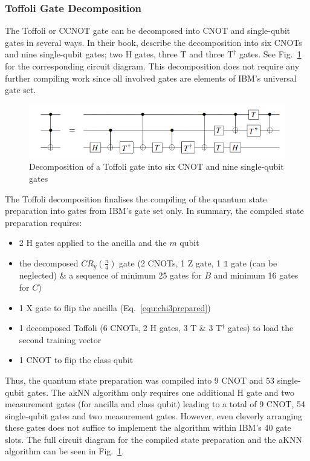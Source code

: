 \subsubsection{Toffoli Gate Decomposition}
\label{subsubsubsec:toffoli}

The Toffoli or CCNOT gate can be decomposed into CNOT and single-qubit gates in several ways. In their book,  describe the decomposition into six CNOTs and nine single-qubit gates; two H gates, three T and three T$^\dagger$ gates. See Fig.~\ref{img:toffolidecomp} for the corresponding circuit diagram. This decomposition does not require any further compiling work since all involved gates are elements of IBM's universal gate set.

\begin{figure}[!ht]
       \centering
       \includegraphics[scale=0.5]{img/toffolidecomposition.png}
       \caption[]{\label{img:toffolidecomp} Decomposition of a Toffoli gate into six CNOT and nine single-qubit gates\footnotemark[17]}
\end{figure}


The Toffoli decomposition finalises the compiling of the quantum state preparation into gates from IBM's gate set only. In summary, the compiled state preparation requires: 
\begin{itemize}
\item 2 H gates applied to the ancilla and the $m$ qubit
\item the decomposed $CR_y(\frac{\pi}{4})$ gate (2 CNOTs, 1 Z gate, 1 $\mathbb{1}$ gate (can be neglected) \& a sequence of minimum 25 gates for $B$ and minimum 16 gates for $C$)
\item 1 X gate to flip the ancilla (Eq.~\ref{equ:chi3prepared})
\item 1 decomposed Toffoli (6 CNOTs, 2 H gates, 3 T \& 3 T$^\dagger$ gates) to load the second training vector
\item 1 CNOT to flip the class qubit
\end{itemize}
Thus, the quantum state preparation was compiled into 9 CNOT and 53 single-qubit gates. The akNN algorithm only requires one additional H gate and two measurement gates (for ancilla and class qubit) leading to a total of 9 CNOT, 54 single-qubit gates and two measurement gates. However, even cleverly arranging these gates does not suffice to implement the algorithm within IBM's 40 gate slots. The full circuit diagram for the compiled state preparation and the aKNN algorithm can be seen in Fig.~\ref{img:toffolidecomp}.

